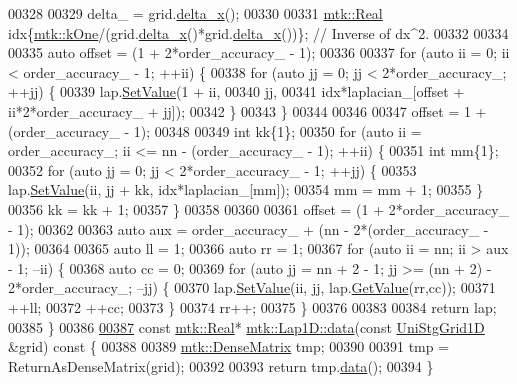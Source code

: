 \begin{DoxyCode}
00328 
00329   delta\_ = grid.\hyperlink{classmtk_1_1UniStgGrid1D_a6e7173b01241632cf509496d66b9f74c}{delta\_x}();
00330 
00331   \hyperlink{group__c01-roots_gac080bbbf5cbb5502c9f00405f894857d}{mtk::Real} idx\{\hyperlink{group__c01-roots_ga26407c24d43b6b95480943340d285c71}{mtk::kOne}/(grid.\hyperlink{classmtk_1_1UniStgGrid1D_a6e7173b01241632cf509496d66b9f74c}{delta\_x}()*grid.\hyperlink{classmtk_1_1UniStgGrid1D_a6e7173b01241632cf509496d66b9f74c}{delta\_x}())\}; \textcolor{comment}{// Inverse of
       dx^2.}
00332 
00334 
00335   \textcolor{keyword}{auto} offset = (1 + 2*order\_accuracy\_ - 1);
00336 
00337   \textcolor{keywordflow}{for} (\textcolor{keyword}{auto} ii = 0; ii < order\_accuracy\_ - 1; ++ii) \{
00338     \textcolor{keywordflow}{for} (\textcolor{keyword}{auto} jj = 0; jj < 2*order\_accuracy\_; ++jj) \{
00339       lap.\hyperlink{classmtk_1_1DenseMatrix_a784ce5784109ac86bfb9d8562b334b13}{SetValue}(1 + ii,
00340                    jj,
00341                    idx*laplacian\_[offset + ii*2*order\_accuracy\_ + jj]);
00342     \}
00343   \}
00344 
00346 
00347   offset = 1 + (order\_accuracy\_ - 1);
00348 
00349   \textcolor{keywordtype}{int} kk\{1\};
00350   \textcolor{keywordflow}{for} (\textcolor{keyword}{auto} ii = order\_accuracy\_; ii <= nn - (order\_accuracy\_ - 1); ++ii) \{
00351     \textcolor{keywordtype}{int} mm\{1\};
00352     \textcolor{keywordflow}{for} (\textcolor{keyword}{auto} jj = 0; jj < 2*order\_accuracy\_ - 1; ++jj) \{
00353       lap.\hyperlink{classmtk_1_1DenseMatrix_a784ce5784109ac86bfb9d8562b334b13}{SetValue}(ii, jj + kk, idx*laplacian\_[mm]);
00354       mm = mm + 1;
00355     \}
00356     kk = kk + 1;
00357   \}
00358 
00360 
00361   offset = (1 + 2*order\_accuracy\_ - 1);
00362 
00363   \textcolor{keyword}{auto} aux = order\_accuracy\_ + (nn - 2*(order\_accuracy\_ - 1));
00364 
00365   \textcolor{keyword}{auto} ll = 1;
00366   \textcolor{keyword}{auto} rr = 1;
00367   \textcolor{keywordflow}{for} (\textcolor{keyword}{auto} ii = nn; ii > aux - 1; --ii) \{
00368     \textcolor{keyword}{auto} cc = 0;
00369     \textcolor{keywordflow}{for} (\textcolor{keyword}{auto} jj = nn + 2 - 1; jj >= (nn + 2) - 2*order\_accuracy\_; --jj) \{
00370       lap.\hyperlink{classmtk_1_1DenseMatrix_a784ce5784109ac86bfb9d8562b334b13}{SetValue}(ii, jj, lap.\hyperlink{classmtk_1_1DenseMatrix_a4b23ecbebd970b5eea915dbb50691024}{GetValue}(rr,cc));
00371       ++ll;
00372       ++cc;
00373     \}
00374     rr++;
00375   \}
00376 
00383 
00384   \textcolor{keywordflow}{return} lap;
00385 \}
00386 
\hypertarget{mtk__lap__1d_8cc_source_l00387}{}\hyperlink{classmtk_1_1Lap1D_ab2652725a8407c79247680c7bbd073b8}{00387} \textcolor{keyword}{const} \hyperlink{group__c01-roots_gac080bbbf5cbb5502c9f00405f894857d}{mtk::Real}* \hyperlink{classmtk_1_1Lap1D_ab2652725a8407c79247680c7bbd073b8}{mtk::Lap1D::data}(\textcolor{keyword}{const} \hyperlink{classmtk_1_1UniStgGrid1D}{UniStgGrid1D} &grid)\textcolor{keyword}{ const }\{
00388 
00389   \hyperlink{classmtk_1_1DenseMatrix}{mtk::DenseMatrix} tmp;
00390 
00391   tmp = ReturnAsDenseMatrix(grid);
00392 
00393   \textcolor{keywordflow}{return} tmp.\hyperlink{classmtk_1_1DenseMatrix_a0c33b8a9e01d157c61ddbdf807c25d84}{data}();
00394 \}
\end{DoxyCode}

